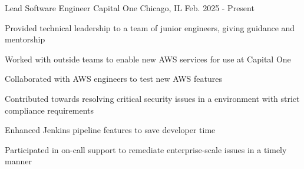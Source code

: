 

\begin{cventryroles}

\begin{cventries}
  \cventry
    {Lead Software Engineer} %
    {Capital One} %
    {Chicago, IL} %
    {Feb. 2025 - Present} %
    {
      \begin{cvitems} %
        \item {Provided technical leadership to a team of junior engineers, giving guidance and mentorship}
         \item {Worked with outside teams to enable new AWS services for use at Capital One}
         \item {Collaborated with AWS engineers to test new AWS features} 
         \item {Contributed towards resolving critical security issues in a environment with strict compliance requirements}
         \item {Enhanced Jenkins pipeline features to save developer time}
         \item {Participated in on-call support to remediate enterprise-scale issues in a timely manner}
      \end{cvitems}
    }
\end{cventries}
  

\end{cventryroles}
